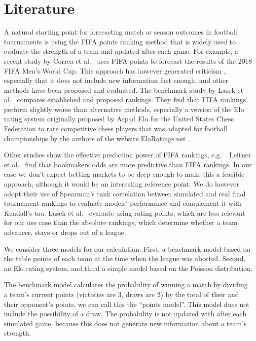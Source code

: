 \documentclass[12pt,a4paper]{article}
\begin{document}
\hypertarget{literature}{%
\section{Literature}\label{literature}}

A natural starting point for forecasting match or season outcomes in
football tournaments is using the FIFA points ranking method that is
widely used to evaluate the strength of a team and updated after each
game. For example, a recent study by Correa et al.~\autocite*{correa}
uses FIFA points to forecast the results of the 2018 FIFA Men's World
Cup. This approach has however generated criticism
\textcite{mchale2007}, especially that it does not include new
information fast enough, and other methods have been proposed and
evaluated. The benchmark study by Lasek et al.~\autocite*{lasek2013}
compares established and proposed rankings. They find that FIFA rankings
perform slightly worse than alternative methods, especially a version of
the Elo rating system originally proposed by Arpad Elo for the United
States Chess Federation to rate competitive chess players that was
adapted for football championships by the authors of the website
EloRatings.net \autocite*{eloratings}.

Other studies show the effective prediction power of FIFA rankings,
e.g.~\textcite{suzuki2008}. Leitner et al.~\autocite*{leitner2010} find
that bookmakers odds are more predictive than FIFA rankings. In our case
we don't expect betting markets to be deep enough to make this a
feasible approach, although it would be an interesting reference point.
We do however adopt their use of Spearman's rank correlation between
simulated and real final tournament rankings to evaluate models'
performance and complement it with Kendall's tau. Lasek et
al.~\autocite*{lasek2013} evaluate using rating points, which are less
relevant for our use case than the absolute rankings, which determine
whether a team advances, stays or drops out of a league.

We consider three models for our calculation: First, a benchmark model
based on the table points of each team at the time when the league was
aborted. Second, an Elo rating system, and third a simple model based on
the Poisson distribution.

The benchmark model calculates the probability of winning a match by
dividing a team's current points (victories are 3, draws are 2) by the
total of their and their opponent's points, we can call this the
\enquote{points model}. This model does not include the possibility of a
draw. The probability is not updated with after each simulated game,
because this does not generate new information about a team's strength.
\end{document}
